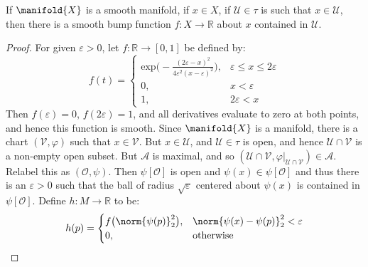 \documentclass{article}                                                        %
\begin{document}
            \begin{theorem}
                If $\manifold{X}$ is a smooth manifold, if $x\in{X}$, if
                $\mathcal{U}\in\tau$ is such that $x\in\mathcal{U}$, then there
                is a smooth bump function $f:X\rightarrow\mathbb{R}$ about $x$
                contained in $\mathcal{U}$.
            \end{theorem}
            \begin{proof}
                For given $\varepsilon>0$, let $f:\mathbb{R}\rightarrow[0,1]$ be
                defined by:
                \begin{equation}
                    f(t)=\begin{cases}
                        \textrm{exp}\Big(
                            \minus\frac{(2\varepsilon-x)^{2}}
                                {4\varepsilon^{2}(x-\varepsilon)^{2}}
                            \Big),&\varepsilon\leq{x}\leq{2}\varepsilon\\
                            0,&x<\varepsilon\\
                            1,&2\varepsilon<x
                    \end{cases}
                \end{equation}
                Then $f(\varepsilon)=0$, $f(2\varepsilon)=1$, and all
                derivatives evaluate to zero at both points, and hence this
                function is smooth. Since $\manifold{X}$ is a manifold, there is
                a chart $(\mathcal{V},\varphi)$ such that $x\in\mathcal{V}$.
                But $x\in\mathcal{U}$, and $\mathcal{U}\in\tau$ is open, and
                hence $\mathcal{U}\cap\mathcal{V}$ is a non-empty open subset.
                But $\mathcal{A}$ is maximal, and so
                $(\mathcal{U}\cap\mathcal{V},%
                 \varphi|_{\mathcal{U}\cap\mathcal{V}})\in\mathcal{A}$.
                Relabel this as $(\mathcal{O},\psi)$. Then
                $\psi[\mathcal{O}]$ is open and $\psi(x)\in\psi[\mathcal{O}]$
                and thus there is an $\varepsilon>0$ such that the ball of
                radius $\sqrt{\varepsilon}$ centered about $\psi(x)$ is
                contained in $\psi[\mathcal{O}]$. Define
                $h:M\rightarrow\mathbb{R}$ to be:
                \begin{equation}
                    h(p)=
                    \begin{cases}
                        f\big(\norm{\psi(p)}_{2}^{2}\big),
                            &\norm{\psi(x)-\psi(p)}_{2}^{2}<\varepsilon\\
                        0,&\textrm{otherwise}
                    \end{cases}
                \end{equation}
            \end{proof}
\end{document}
